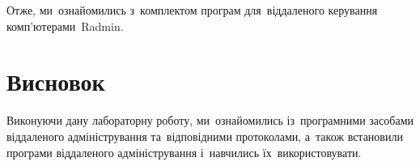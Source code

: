 \documentclass[
	a4paper,
	oneside,
	BCOR = 10mm,
	DIV = 12,
	12pt,
	headings = normal,
]{scrartcl}
\begin{document}
			Отже, ми~ознайомились з~комплектом програм для~віддаленого керування комп'ютерами~\textenglish{Radmin}.

	\section{Висновок}
		Виконуючи дану лабораторну роботу, ми~ознайомились із~програмними засобами віддаленого адміністрування та~відповідними протоколами, а~також встановили програми віддаленого адміністрування і~навчились їх~використовувати.
\end{document}
